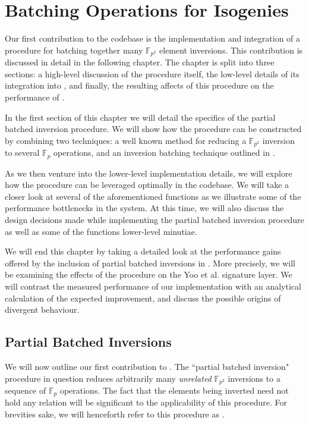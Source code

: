 \chapter{Batching Operations for Isogenies}

Our first contribution to the \sidh codebase is the implementation and integration of a procedure for batching together many $\mathbb{F}_{p^2}$ element inversions. This contribution is discussed in detail in the following chapter. The chapter is split into three sections: a high-level discussion of the procedure itself, the low-level details of its integration into \sidh, and finally, the resulting affects of this procedure on the performance of \sidh. 

In the first section of this chapter we will detail the specifics of the partial batched inversion procedure. We will show how the procedure can be constructed by combining two techniques: a well known method for reducing a $\mathbb{F}_{p^2}$ inversion to several $\mathbb{F}_{p}$ operations, and an inversion batching technique outlined in \cite{batching}. 

As we then venture into the lower-level implementation details, we will explore how the procedure can be leveraged optimally in the codebase. We will take a closer look at several of the aforementioned \sidh functions as we illustrate some of the performance bottlenecks in the system. At this time, we will also discuss the design decisions made while implementing the partial batched inversion procedure as well as some of the functions lower-level minutiae.

We will end this chapter by taking a detailed look at the performance gains offered by the inclusion of partial batched inversions in \sidh. More precisely, we will be examining the effects of the procedure on the Yoo et al. signature layer. We will contrast the measured performance of our implementation with an analytical calculation of the expected improvement, and discuss the possible origins of divergent behaviour.  

\section{Partial Batched Inversions}

We will now outline our first contribution to \sidh. The ``partial batched inversion" procedure in question reduces arbitrarily many \emph{unrelated} $\mathbb{F}_{p^{2}}$ inversions to a sequence of $\mathbb{F}_{p}$ operations. The fact that the elements being inverted need not hold any relation will be significant to the applicability of this procedure. For brevities sake, we will henceforth refer to this procedure as .

